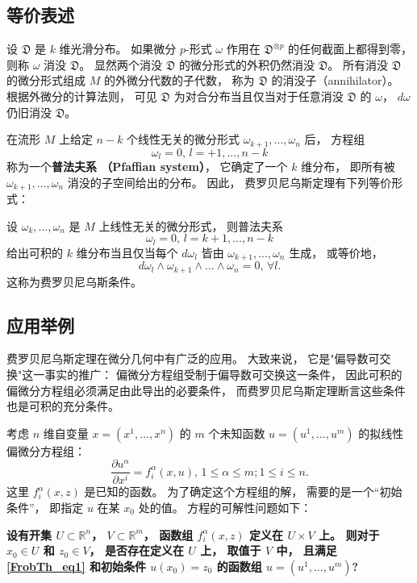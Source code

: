 \subsection{等价表述}
设 $\mathfrak{D}$ 是 $k$ 维光滑分布。 如果微分 $p$-形式 $\omega$ 作用在 $\mathfrak{D}^{\otimes p}$ 的任何截面上都得到零， 则称 $\omega$ 消没 $\mathfrak{D}$。 显然两个消没 $\mathfrak{D}$ 的微分形式的外积仍然消没 $\mathfrak{D}$。 所有消没 $\mathfrak{D}$ 的微分形式组成 $M$ 的外微分代数的子代数， 称为 $\mathfrak{D}$ 的消没子（annihilator）。 根据外微分的计算法则， 可见 $\mathfrak{D}$ 为对合分布当且仅当对于任意消没 $\mathfrak{D}$ 的 $\omega$， $d\omega$ 仍旧消没 $\mathfrak{D}$。 

在流形 $M$ 上给定 $n-k$ 个线性无关的微分形式 $\omega_{k+1},...,\omega_{n}$ 后， 方程组
$$
\omega_{l}=0,\,l=+1,...,n-k
$$
称为一个\textbf{普法夫系 （Pfaffian system）}， 它确定了一个 $k$ 维分布， 即所有被 $\omega_{k+1},...,\omega_{n}$ 消没的子空间给出的分布。 因此， 费罗贝尼乌斯定理有下列等价形式：
\begin{theorem}{}
设 $\omega_{k},...,\omega_{n}$ 是 $M$ 上线性无关的微分形式， 则普法夫系
$$
\omega_{l}=0,\,l=k+1,...,n-k
$$
给出可积的 $k$ 维分布当且仅当每个 $d\omega_l$ 皆由 $\omega_{k+1},...,\omega_{n}$ 生成， 或等价地，
$$
d\omega_{l}\wedge\omega_{k+1}\wedge...\wedge\omega_{n}=0,\,\forall l.
$$
这称为费罗贝尼乌斯条件。
\end{theorem}

\subsection{应用举例}
费罗贝尼乌斯定理在微分几何中有广泛的应用。 大致来说， 它是"偏导数可交换"这一事实的推广： 偏微分方程组受制于偏导数可交换这一条件， 因此可积的偏微分方程组必须满足由此导出的必要条件， 而费罗贝尼乌斯定理断言这些条件也是可积的充分条件。

考虑 $n$ 维自变量 $x=(x^1,...,x^n)$ 的 $m$ 个未知函数 $u=(u^1,...,u^m)$ 的拟线性偏微分方程组：
\begin{equation}\label{FrobTh_eq1}
\frac{\partial u^\alpha}{\partial x^i}=f_i^\alpha(x,u),\,1\leq\alpha\leq m;1\leq i\leq n.
\end{equation}
这里 $f_i^\alpha(x,z)$ 是已知的函数。 为了确定这个方程组的解， 需要的是一个“初始条件”， 即指定 $u$ 在某 $x_0$ 处的值。 方程的可解性问题如下：

\textbf{设有开集 $U\subset\mathbb{R}^n$， $V\subset\mathbb{R}^m$， 函数组 $f_i^\alpha(x,z)$ 定义在 $U\times V$ 上。 则对于 $x_0\in U$ 和 $z_0\in V$， 是否存在定义在 $U$ 上， 取值于 $V$ 中， 且满足\autoref{FrobTh_eq1} 和初始条件 $u(x_0)=z_0$ 的函数组 $u=(u^1,...,u^m)$?}

